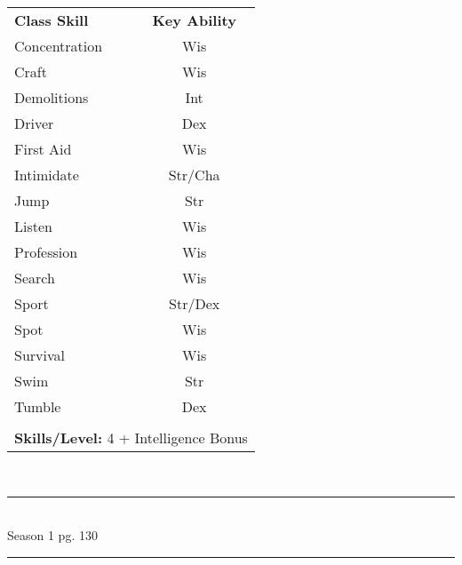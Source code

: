 \begin{table}[htb]
\raggedright
\begin{tabular}{l c}
\textbf{Class Skill} & \textbf{Key Ability}\\

Concentration & Wis\\
Craft & Wis\\
Demolitions & Int\\
Driver & Dex\\
First Aid & Wis\\
Intimidate & Str/Cha\\
Jump & Str\\
Listen & Wis\\
Profession & Wis\\
Search & Wis\\
Sport & Str/Dex\\
Spot & Wis\\
Survival & Wis\\
Swim & Str\\
Tumble & Dex\\


\multicolumn{2}{l}{\cellcolor{white}}\\
\multicolumn{2}{l}{\cellcolor{white}\textbf{Skills/Level:} 4 + Intelligence Bonus}\\
\end{tabular}
\end{table}

\setlength{\intextsep}{14.0pt plus 4.0pt minus 4.0pt}

\vspace*{4cm}

\vspace*{\fill}

\begin{center}
\textsc{\Large}\\[0.25cm]
\rule{\linewidth}{0.5mm}\\[0.6cm]
\fontsize{30}{30} \selectfont Season 1 pg. 130\\
\rule{\linewidth}{0.5mm}\\[0.6cm]
\vfill
\end{center}

\pagebreak



